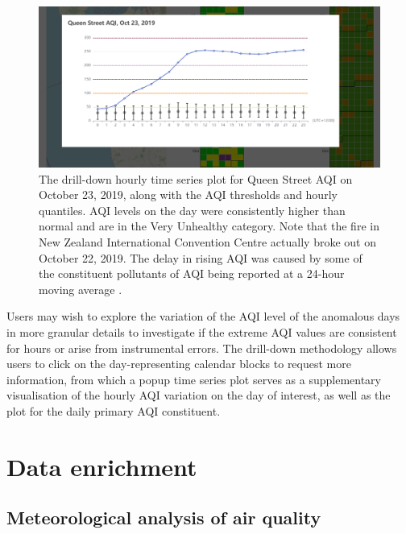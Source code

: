 \documentclass{aucklandthesis}
\begin{document}
\begin{figure}
\includegraphics[width=1\linewidth]{figures/cal-drill-down} \caption{The drill-down hourly time series plot for Queen Street AQI on October 23, 2019, along with the AQI thresholds and hourly quantiles. AQI levels on the day were consistently higher than normal and are in the Very Unhealthy category. Note that the fire in New Zealand International Convention Centre actually broke out on October 22, 2019. The delay in rising AQI was caused by some of the constituent pollutants of AQI being reported at a 24-hour moving average \autocite{aqitarget}.}\label{fig:unnamed-chunk-3}
\end{figure}



Users may wish to explore the variation of the AQI level of the anomalous days in more granular details to investigate if the extreme AQI values are consistent for hours or arise from instrumental errors. The drill-down methodology allows users to click on the day-representing calendar blocks to request more information, from which a popup time series plot serves as a supplementary visualisation of the hourly AQI variation on the day of interest, as well as the plot for the daily primary AQI constituent.

\hypertarget{data-enrichment-1}{%
\section{Data enrichment}\label{data-enrichment-1}}

\hypertarget{meteorological-analysis-of-air-quality}{%
\subsection{Meteorological analysis of air quality}\label{meteorological-analysis-of-air-quality}}
\end{document}
